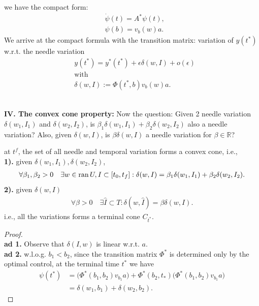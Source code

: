 we have the compact form:
\begin{equation}
\begin{aligned}
	&\dot{\psi}(t) = A^* \psi(t),\\
	&\psi(b) = v_b(w)a.
\end{aligned}
\end{equation}
We arrive at the compact formula with the transition matrix: variation of $y(t^*)$ w.r.t. the needle variation
\begin{equation}\label{eq:needle-var-terminal}
\begin{aligned}
	& y(t^*) = y^*(t^*) + \epsilon \delta(w, I) + o(\epsilon)\\
	& \text{with}\\
	& \delta(w, I):= \Phi(t^*, b)v_b(w) a. 
\end{aligned}
\end{equation}

\quad\\
\textbf{IV. The convex cone property:}
Now the question: Given 2 needle variation $\delta(w_1, I_1)$ and $\delta(w_2, I_2)$, is $\beta_1 \delta(w_1, I_1) + \beta_2 \delta(w_2, I_2)$ also a needle variation? Also, given $\delta(w, I)$, is $\beta \delta(w, I)$ a needle variation for $\beta \in \mathbb{R}$?


\begin{theorem}
	at $t^f$, the set of all needle and temporal variation forms a convex cone, i.e., \\
	\textbf{1).}  given $\delta(w_1, I_1), \delta(w_2, I_2)$, 
	\begin{align*}
		\forall \beta_1, \beta_2 > 0 \quad \exists w \in \operatorname{ran} U, I \subset [t_0, t_f]: \delta(w, I) = \beta_1 \delta(w_1, I_1) + \beta_2 \delta (w_2, I_2). 
	\end{align*}
	\textbf{2).} given $\delta(w, I)$
	\begin{align*}
		\forall \beta >0  \quad \exists \hat{I} \subset T: \delta(w, \hat{I}) = \beta \delta(w, I). 
	\end{align*}
	i.e., all the variations forms a terminal cone $C_{t^*}$. 
\end{theorem}
\begin{proof}\qquad\\
\textbf{ad 1.} Observe that $\delta(I, w)$ is linear w.r.t. $a$.\\
\textbf{ad 2.} w.l.o.g. $b_1 < b_2$, since the transition matrix $\Phi^*$ is determined only by the optimal control, at the terminal time $t^*$ we have 
\begin{align*}
	\psi(t^*) &=   \bigg( \Phi^*(b_1, b_2)v_{b_1} a \bigg) + \Phi^*(b_2, t_*) \bigg(\Phi^*(b_1, b_2)v_{b_1} a  \bigg)\\
	& = \delta(w_1, b_1) + \delta(w_2, b_2). 
\end{align*}
\end{proof}


